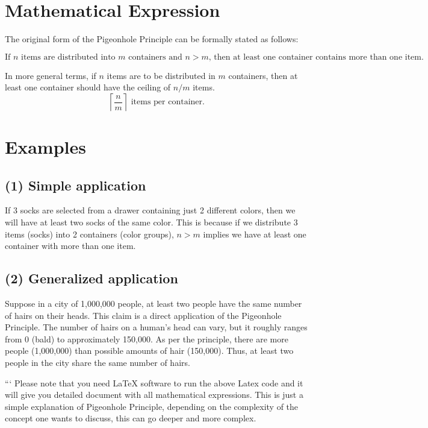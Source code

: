 \section*{Mathematical Expression}

The original form of the Pigeonhole Principle can be formally stated as follows:

\[
\text{If } n \text{ items are distributed into } m \text{ containers and } n > m \text{, then at least one container contains more than one item.}
\]

In more general terms, if $n$ items are to be distributed in $m$ containers, then at least one container should have the ceiling of $n/m$ items.
\[
\left\lceil \frac{n}{m} \right\rceil \text{ items per container}.
\]

\section*{Examples}

\subsection*{(1) Simple application}

If 3 socks are selected from a drawer containing just 2 different colors, then we will have at least two socks of the same color. This is because if we distribute 3 items (socks) into 2 containers (color groups), $n > m$ implies we have at least one container with more than one item.

\subsection*{(2) Generalized application}

Suppose in a city of 1,000,000 people, at least two people have the same number of hairs on their heads. This claim is a direct application of the Pigeonhole Principle. The number of hairs on a human's head can vary, but it roughly ranges from 0 (bald) to approximately 150,000. As per the principle, there are more people (1,000,000) than possible amounts of hair (150,000). Thus, at least two people in the city share the same number of hairs.


```
Please note that you need LaTeX software to run the above Latex code and it will give you detailed document with all mathematical expressions. This is just a simple explanation of Pigeonhole Principle, depending on the complexity of the concept one wants to discuss, this can go deeper and more complex.

